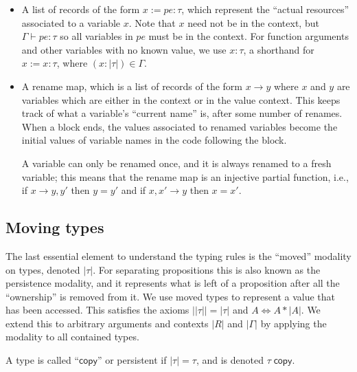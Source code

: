 \documentclass[acmsmall,nonacm]{acmart}
\newcommand{\core}[1]{\left| #1 \right|}
\newcommand{\proves}{\vdash}
\begin{document}
\begin{itemize}
\item A list of records of the form $x:=pe:\tau$, which represent the ``actual resources'' associated to a variable $x$. Note that $x$ need not be in the context, but $\Gamma\proves pe:\tau$ so all variables in $pe$ must be in the context. For function arguments and other variables with no known value, we use $x:\tau$, a shorthand for $x:=x:\tau$, where $(x:\core\tau)\in\Gamma$.
\item A rename map, which is a list of records of the form $x\to y$ where $x$ and $y$ are variables which are either in the context or in the value context. This keeps track of what a variable's ``current name'' is, after some number of renames. When a block ends, the values associated to renamed variables become the initial values of variable names in the code following the block.

A variable can only be renamed once, and it is always renamed to a fresh variable; this means that the rename map is an injective partial function, i.e., if $x\to y,y'$ then $y=y'$ and if $x,x'\to y$ then $x=x'$.
\end{itemize}

\subsection{Moving types}\label{sec:moving}

The last essential element to understand the typing rules is the ``moved'' modality on types, denoted $\core\tau$. For separating propositions this is also known as the persistence modality, and it represents what is left of a proposition after all the ``ownership'' is removed from it. We use moved types to represent a value that has been accessed. This satisfies the axioms $\core{\core\tau}=\core\tau$ and $A\Leftrightarrow A\ast\core A$. We extend this to arbitrary arguments and contexts $\core R$ and $\core\Gamma$ by applying the modality to all contained types.

A type is called ``$\mathsf{copy}$'' or persistent if $\core\tau=\tau$, and is denoted $\tau\;\mathsf{copy}$.
\end{document}

